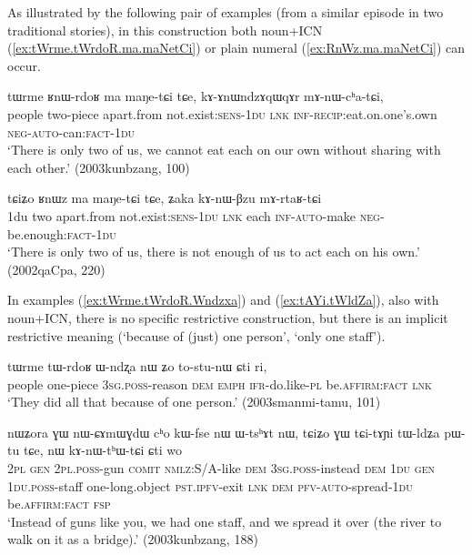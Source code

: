 As illustrated by the following pair of examples (from a similar episode in two traditional stories), in this construction both noun+ICN  (\ref{ex:tWrme.tWrdoR.ma.maNetCi})  or plain numeral (\ref{ex:RnWz.ma.maNetCi}) can occur.

\begin{exe}
\ex \label{ex:tWrme.tWrdoR.ma.maNetCi}
\gll tɯrme ʁnɯ-rdoʁ ma maŋe-tɕi tɕe, kɤ-ɤnɯndzɤqɯqɤr mɤ-nɯ-cʰa-tɕi, \\
people two-piece apart.from not.exist:\textsc{sens}-\textsc{1du} \textsc{lnk} \textsc{inf}-\textsc{recip}:eat.on.one's.own \textsc{neg}-\textsc{auto}-can:\textsc{fact}-\textsc{1du} \\
\glt `There is only two of us, we cannot eat each on our own without sharing with each other.' (2003kunbzang, 100)
\end{exe} 

\begin{exe}
\ex \label{ex:RnWz.ma.maNetCi}
\gll  tɕiʑo ʁnɯz ma maŋe-tɕi tɕe, ʑaka kɤ-nɯ-βzu mɤ-rtaʁ-tɕi \\
1du two apart.from not.exist:\textsc{sens}-\textsc{1du} \textsc{lnk} each \textsc{inf}-\textsc{auto}-make \textsc{neg}-be.enough:\textsc{fact}-\textsc{1du} \\
\glt  `There is only two of us, there is not enough of us to act each on his own.' (2002qaCpa, 220)
\end{exe} 

In examples (\ref{ex:tWrme.tWrdoR.Wndzxa}) and (\ref{ex:tAYi.tWldZa}), also with noun+ICN, there is no specific restrictive construction, but there is an implicit restrictive meaning (`because of (just) one person', `only one staff'). 

\begin{exe}
\ex \label{ex:tWrme.tWrdoR.Wndzxa}
\gll tɯrme tɯ-rdoʁ ɯ-ndʐa nɯ ʑo to-stu-nɯ ɕti ri, \\
people one-piece  \textsc{3sg}.\textsc{poss}-reason \textsc{dem} \textsc{emph} \textsc{ifr}-do.like-\textsc{pl} be.\textsc{affirm}:\textsc{fact} \textsc{lnk} \\
\glt `They did all that because of one person.' (2003smanmi-tamu, 101)
\end{exe} 

\begin{exe}
\ex \label{ex:tAYi.tWldZa}
\gll nɯʑora ɣɯ nɯ-ɕɤmɯɣdɯ cʰo kɯ-fse nɯ ɯ-tsʰɤt nɯ, tɕiʑo ɣɯ tɕi-tɤɲi tɯ-ldʑa pɯ-tu tɕe, nɯ kɤ-nɯ-tʰɯ-tɕi ɕti wo \\
\textsc{2pl} \textsc{gen} \textsc{2pl}.\textsc{poss}-gun \textsc{comit} \textsc{nmlz}:S/A-like \textsc{dem} \textsc{3sg}.\textsc{poss}-instead \textsc{dem}  \textsc{1du} \textsc{gen} \textsc{1du}.\textsc{poss}-staff one-long.object \textsc{pst}.\textsc{ipfv}-exit \textsc{lnk} \textsc{dem} \textsc{pfv}-\textsc{auto}-spread-\textsc{1du} be.\textsc{affirm}:\textsc{fact} \textsc{fsp} \\
\glt `Instead of guns like you, we had one staff, and we spread it over (the river to walk on it as a bridge).' (2003kunbzang, 188)
\end{exe} 

